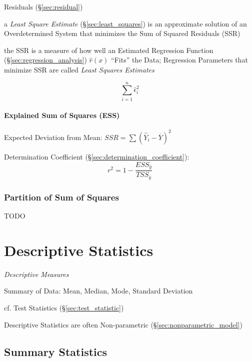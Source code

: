 Residuals (\S\ref{sec:residual})

\fist a \emph{Least Square Estimate} (\S\ref{sec:least_squares}) is an
approximate solution of an Overdetermined System that minimizes the Sum of
Squared Residuals (SSR)

the SSR is a measure of how well an Estimated Regression Function
(\S\ref{sec:regression_analysis}) $\hat{r}(x)$ ``Fits'' the Data; Regression
Parameters that minimize SSR are called \emph{Least Squares Estimates}

\[
  \sum_{i=1}^n \hat{\epsilon}_i^2
\]



\paragraph{Explained Sum of Squares (ESS)}\label{sec:ess}\hfill

Expected Deviation from Mean: $SSR = \sum(\hat{Y}_i - \overline{Y})^2$

Determination Coefficient (\S\ref{sec:determination_coefficient}):
\[
  r^2 = 1 - \frac{
    ESS_{\hat{y}}
  }{
    TSS_{\overline{y}}
  }
\]



\subsubsection{Partition of Sum of Squares}\label{sec:partition_squares}

TODO



\section{Descriptive Statistics}\label{sec:descriptive_statistics}

\emph{Descriptive Measures}

Summary of Data: Mean, Median, Mode, Standard Deviation

cf. Test Statistics (\S\ref{sec:test_statistic})

Descriptive Statistics are often Non-parametric
(\S\ref{sec:nonparametric_model})



\subsection{Summary Statistics}\label{sec:summary_statistics}

